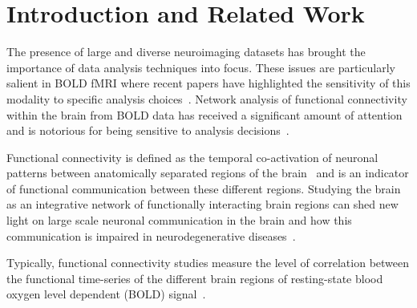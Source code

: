 \documentclass{article}
\begin{document}
\section{Introduction and Related Work}


The presence of large and diverse neuroimaging datasets has brought the importance of data analysis techniques into focus.  These issues are particularly salient in BOLD fMRI where recent papers have highlighted the sensitivity of this modality to specific analysis choices~\citep{carp6plurality,haller2009pitfalls}.  Network analysis of functional connectivity within the brain from BOLD data has received a significant amount of attention and is notorious for being sensitive to analysis decisions~\citep{dawson2012evaluation,eke2012pitfalls}. 

Functional connectivity is defined as the temporal co-activation of neuronal patterns between anatomically separated regions of the brain~\citep{aertsen1989dynamics} and is an indicator of functional communication between these different regions.  Studying the brain as an integrative network of functionally interacting brain regions can shed new light on large scale neuronal communication in the brain and how this communication is impaired in neurodegenerative diseases~\citep{bullmore2009complex,mohammadi2009changes,seeley2009neurodegenerative}. 

Typically, functional connectivity studies measure the level of correlation between the functional time-series of the different brain regions of resting-state blood oxygen level dependent (BOLD) signal~\citep{biswal1997simultaneous,damoiseaux2006consistent,salvador2005neurophysiological}.
\end{document}
